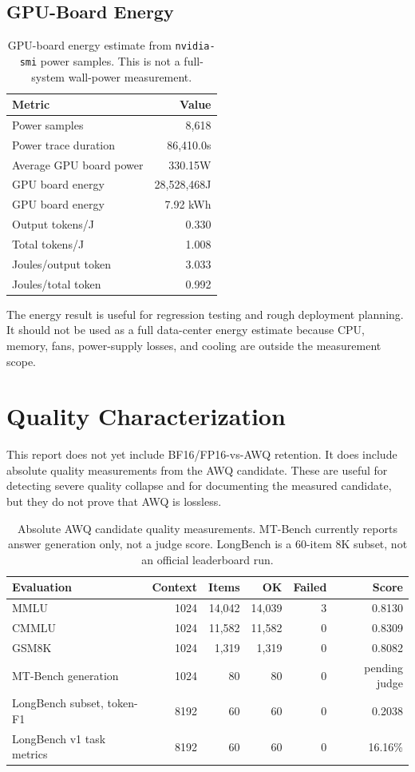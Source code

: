 \documentclass[11pt]{article}
\begin{document}
\subsection{GPU-Board Energy}

\begin{table}[h]
\centering
\small
\begin{tabular}{lr}
\toprule
Metric & Value \\
\midrule
Power samples & 8,618 \\
Power trace duration & 86,410.0s \\
Average GPU board power & 330.15W \\
GPU board energy & 28,528,468J \\
GPU board energy & 7.92 kWh \\
Output tokens/J & 0.330 \\
Total tokens/J & 1.008 \\
Joules/output token & 3.033 \\
Joules/total token & 0.992 \\
\bottomrule
\end{tabular}
\caption{GPU-board energy estimate from \texttt{nvidia-smi} power samples. This
is not a full-system wall-power measurement.}
\label{tab:energy}
\end{table}

The energy result is useful for regression testing and rough deployment
planning. It should not be used as a full data-center energy estimate because
CPU, memory, fans, power-supply losses, and cooling are outside the measurement
scope.

\section{Quality Characterization}

This report does not yet include BF16/FP16-vs-AWQ retention. It does include
absolute quality measurements from the AWQ candidate. These are useful for
detecting severe quality collapse and for documenting the measured candidate,
but they do not prove that AWQ is lossless.

\begin{table}[h]
\centering
\small
\begin{tabular}{lrrrrr}
\toprule
Evaluation & Context & Items & OK & Failed & Score \\
\midrule
MMLU & 1024 & 14,042 & 14,039 & 3 & 0.8130 \\
CMMLU & 1024 & 11,582 & 11,582 & 0 & 0.8309 \\
GSM8K & 1024 & 1,319 & 1,319 & 0 & 0.8082 \\
MT-Bench generation & 1024 & 80 & 80 & 0 & pending judge \\
LongBench subset, token-F1 & 8192 & 60 & 60 & 0 & 0.2038 \\
LongBench v1 task metrics & 8192 & 60 & 60 & 0 & 16.16\% \\
\bottomrule
\end{tabular}
\caption{Absolute AWQ candidate quality measurements. MT-Bench currently reports
answer generation only, not a judge score. LongBench is a 60-item 8K subset, not
an official leaderboard run.}
\label{tab:quality}
\end{table}
\end{document}
